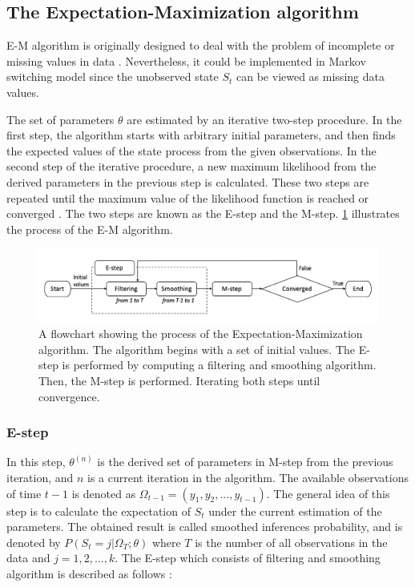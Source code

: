 \subsection{The Expectation-Maximization algorithm}

E-M algorithm is originally designed to deal with the problem of incomplete
or missing values in data \citep{dempster1977maximum}. Nevertheless,
it could be implemented in Markov switching model since the unobserved
state $S_{t}$ can be viewed as missing data values. 

The set of parameters $\theta$ are estimated by an iterative two-step
procedure. In the first step, the algorithm starts with arbitrary
initial parameters, and then finds the expected values of the state
process from the given observations. In the second step of the iterative
procedure, a new maximum likelihood from the derived parameters in
the previous step is calculated. These two steps are repeated until
the maximum value of the likelihood function is reached or converged
\citep{janczura2012efficient}. The two steps are known as the E-step
and the M-step. \ref{em} illustrates the process of the E-M algorithm.

\begin{figure}[H]
\begin{centering}
\includegraphics[scale=0.55]{picture/em}
\par\end{centering}
\caption{A flowchart showing the process of the Expectation-Maximization algorithm.
The algorithm begins with a set of initial values. The E-step is performed
by computing a filtering and smoothing algorithm. Then, the M-step
is performed. Iterating both steps until convergence.}

\label{em}
\end{figure}


\subsubsection{E-step}

In this step, $\theta^{(n)}$ is the derived set of parameters in
M-step from the previous iteration, and $n$ is a current iteration
in the algorithm. The available observations of time $t-1$ is denoted
as $\Omega_{t-1}=(y_{1},y_{2},...,y_{t-1})$. The general idea of
this step is to calculate the expectation of $S_{t}$ under the current
estimation of the parameters. The obtained result is called smoothed
inferences probability, and is denoted by $P(S_{t}=j|\Omega_{T};\theta)$
where $T$ is the number of all observations in the data and $j=1,2,...,k$.
The E-step which consists of filtering and smoothing algorithm is
described as follows \citep{kim1994dynamic}:

